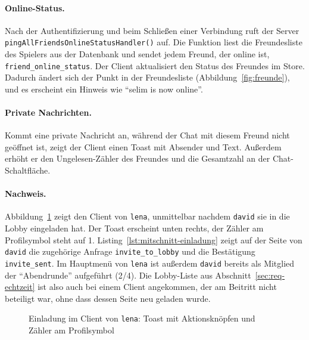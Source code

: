 \paragraph{Online-Status.} Nach der Authentifizierung und beim Schließen einer Verbindung ruft der Server \texttt{pingAllFriendsOnlineStatusHandler()} auf. Die Funktion liest die Freundesliste des Spielers aus der Datenbank und sendet jedem Freund, der online ist, \texttt{friend\_online\_status}. Der Client aktualisiert den Status des Freundes im Store. Dadurch ändert sich der Punkt in der Freundesliste (Abbildung~\ref{fig:freunde}), und es erscheint ein Hinweis wie \enquote{selim is now online}.

\paragraph{Private Nachrichten.} Kommt eine private Nachricht an, während der Chat mit diesem Freund nicht geöffnet ist, zeigt der Client einen Toast mit Absender und Text. Außerdem erhöht er den Ungelesen-Zähler des Freundes und die Gesamtzahl an der Chat-Schaltfläche.

\paragraph{Nachweis.} Abbildung~\ref{fig:einladung} zeigt den Client von \texttt{lena}, unmittelbar nachdem \texttt{david} sie in die Lobby eingeladen hat. Der Toast erscheint unten rechts, der Zähler am Profilsymbol steht auf 1. Listing~\ref{lst:mitschnitt-einladung} zeigt auf der Seite von \texttt{david} die zugehörige Anfrage \texttt{invite\_to\_lobby} und die Bestätigung \texttt{invite\_sent}. Im Hauptmenü von \texttt{lena} ist außerdem \texttt{david} bereits als Mitglied der \enquote{Abendrunde} aufgeführt (2/4). Die Lobby-Liste aus Abschnitt~\ref{sec:req-echtzeit} ist also auch bei einem Client angekommen, der am Beitritt nicht beteiligt war, ohne dass dessen Seite neu geladen wurde.



\begin{figure}[ht]
  \centering
  \caption{Einladung im Client von \texttt{lena}: Toast mit Aktionsknöpfen und Zähler am Profilsymbol}
  \label{fig:einladung}
\end{figure}

